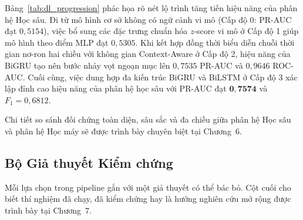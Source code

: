 \begin{table}[H]
\centering
\caption{\textbf{Sự tăng tiến hiệu năng của pipeline Học sâu qua các cấp độ} (biến thể Context, $T_{\text{out}}$; $F_1$ tại ngưỡng $\tau^{*}$ chọn trên OOF)}
\label{tab:dl_progression}
\renewcommand{\arraystretch}{1.25}
\end{table}

Bảng~\ref{tab:dl_progression} phác họa rõ nét lộ trình tăng tiến hiệu năng của phân hệ Học sâu. Đi từ mô hình cơ sở không có ngữ cảnh vi mô (Cấp độ 0: PR-AUC đạt $0{,}5154$), việc bổ sung các đặc trưng chuẩn hóa $z$-score vi mô ở Cấp độ 1 giúp mô hình theo điểm MLP đạt $0{,}5305$. Khi kết hợp đồng thời biểu diễn chuỗi thời gian nơ-ron hai chiều với không gian Context-Aware ở Cấp độ 2, hiệu năng của BiGRU tạo nên bước nhảy vọt ngoạn mục lên $0{,}7535$ PR-AUC và $0{,}9646$ ROC-AUC. Cuối cùng, việc dung hợp đa kiến trúc BiGRU và BiLSTM ở Cấp độ 3 xác lập đỉnh cao hiệu năng của phân hệ học sâu với PR-AUC đạt $\mathbf{0{,}7574}$ và $F_1 = 0{,}6812$.

Chi tiết so sánh đối chứng toàn diện, sâu sắc và đa chiều giữa phân hệ Học sâu và phân hệ Học máy sẽ được trình bày chuyên biệt tại Chương~6.

\subsection{Bộ Giả thuyết Kiểm chứng}
Mỗi lựa chọn trong pipeline gắn với một giả thuyết có thể bác bỏ. Cột cuối cho biết thí nghiệm đã chạy, đã kiểm chứng hay là hướng nghiên cứu mở rộng được trình bày tại Chương~7.

